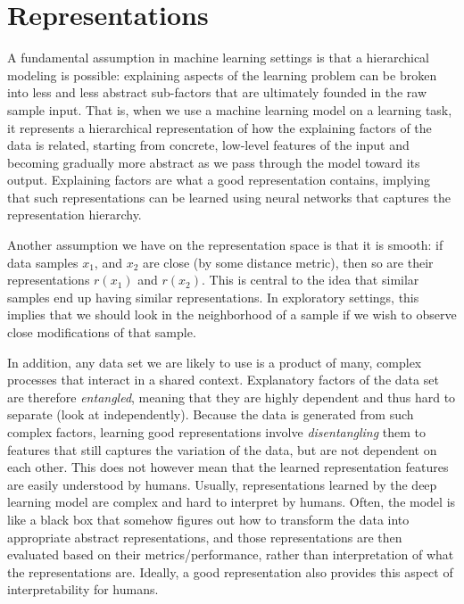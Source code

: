 
\section{Representations}
A fundamental assumption in machine learning settings is that a hierarchical modeling is possible: explaining aspects of the learning problem can be broken into less and less abstract sub-factors that are ultimately founded in the raw sample input. That is, when we use a machine learning model on a learning task, it represents a hierarchical representation of how the explaining factors of the data is related, starting from concrete, low-level features of the input and becoming gradually more abstract as we pass through the model toward its output. Explaining factors are what a good representation contains, implying that such representations can be learned using neural networks that captures the representation hierarchy.

Another assumption we have on the representation space is that it is smooth: if data samples $x_1$, and $x_2$ are close (by some distance metric), then so are their representations $r(x_1)$ and $r(x_2)$. This is central to the idea that similar samples end up having similar representations. In exploratory settings, this implies that we should look in the neighborhood of a sample if we wish to observe close modifications of that sample.

In addition, any data set we are likely to use is a product of many, complex processes that interact in a shared context. Explanatory factors of the data set are therefore \textit{entangled}, meaning that they are highly dependent and thus hard to separate (look at independently). Because the data is generated from such complex factors, learning good representations involve \textit{disentangling} them to features that still captures the variation of the data, but are not dependent on each other. This does not however mean that the learned representation features are easily understood by humans. Usually, representations learned by the deep learning model are complex and hard to interpret by humans. Often, the model is like a black box that somehow figures out how to transform the data into appropriate abstract representations, and those representations are then evaluated based on their metrics/performance, rather than interpretation of what the representations are. Ideally, a good representation also provides this aspect of interpretability for humans.

